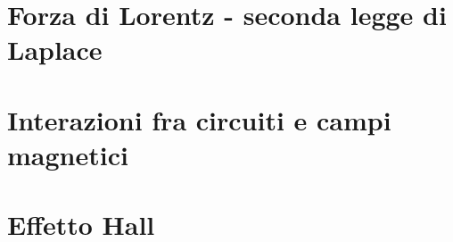 \section{Forza di Lorentz - seconda legge di Laplace}


\section{Interazioni fra circuiti e campi magnetici}


\section{Effetto Hall}

